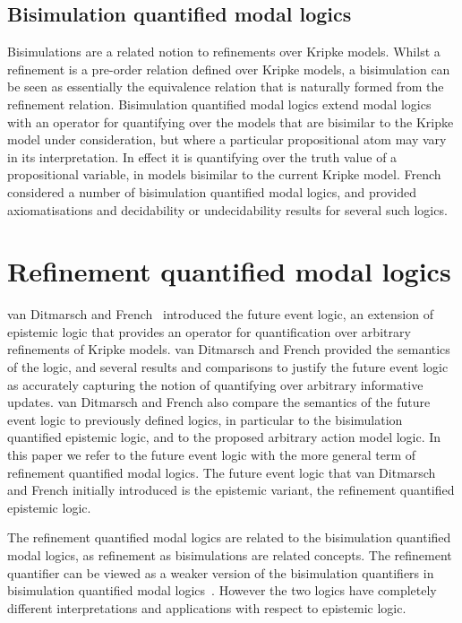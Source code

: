 \subsection{Bisimulation quantified modal logics}

Bisimulations are a related notion to refinements over Kripke models. Whilst a
refinement is a pre-order relation defined over Kripke models, a bisimulation
can be seen as essentially the equivalence relation that is naturally formed
from the refinement relation. Bisimulation quantified modal logics extend modal
logics with an operator for quantifying over the models that are bisimilar to
the Kripke model under consideration, but where a particular propositional atom
may vary in its interpretation. In effect it is quantifying over the truth value
of a propositional variable, in models bisimilar to the current Kripke model.
French~\cite{french2006bisimulation} considered a number of bisimulation
quantified modal logics, and provided axiomatisations and decidability or
undecidability results for several such logics.

\section{Refinement quantified modal logics}

van Ditmarsch and French~\cite{french2009simulation} introduced the future event
logic, an extension of epistemic logic that provides an operator for
quantification over arbitrary refinements of Kripke models. van Ditmarsch and
French provided the semantics of the logic, and several results and comparisons
to justify the future event logic as accurately capturing the notion of
quantifying over arbitrary informative updates. van Ditmarsch and French also
compare the semantics of the future event logic to previously defined logics, in
particular to the bisimulation quantified epistemic logic, and to the proposed
arbitrary action model logic. In this paper we refer to the future event logic
with the more general term of refinement quantified modal logics. The future
event logic that van Ditmarsch and French initially introduced is the epistemic
variant, the refinement quantified epistemic logic.

The refinement quantified modal logics are related to the bisimulation
quantified modal logics, as refinement as bisimulations are related concepts.
The refinement quantifier can be viewed as a weaker version of the bisimulation
quantifiers in bisimulation quantified modal logics~\cite{french2009simulation}.
However the two logics have completely different interpretations and
applications with respect to epistemic logic.

